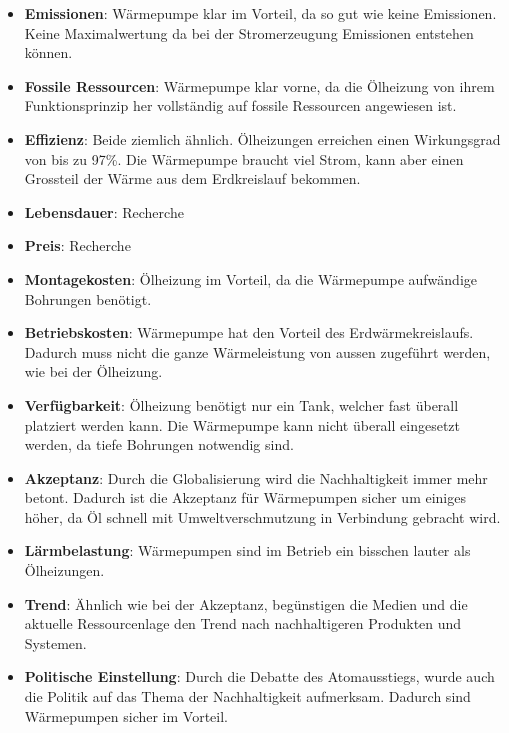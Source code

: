 \begin{itemize}

\item \textbf{Emissionen}: Wärmepumpe klar im Vorteil, da so gut wie keine Emissionen. Keine Maximalwertung da bei der Stromerzeugung Emissionen entstehen können.

\item \textbf{Fossile Ressourcen}: Wärmepumpe klar vorne, da die Ölheizung von ihrem Funktionsprinzip her vollständig auf fossile Ressourcen angewiesen ist.

\item \textbf{Effizienz}: Beide ziemlich ähnlich. Ölheizungen erreichen einen Wirkungsgrad von bis zu 97\%. Die Wärmepumpe braucht viel Strom, kann aber einen Grossteil der Wärme aus dem Erdkreislauf bekommen.

\item \textbf{Lebensdauer}: Recherche

\item \textbf{Preis}: Recherche

\item \textbf{Montagekosten}: Ölheizung im Vorteil, da die Wärmepumpe aufwändige Bohrungen benötigt.

\item \textbf{Betriebskosten}: Wärmepumpe hat den Vorteil des Erdwärmekreislaufs. Dadurch muss nicht die ganze Wärmeleistung von aussen zugeführt werden, wie bei der Ölheizung.

\item \textbf{Verfügbarkeit}: Ölheizung benötigt nur ein Tank, welcher fast überall platziert werden kann. Die Wärmepumpe kann nicht überall eingesetzt werden, da tiefe Bohrungen notwendig sind. 

\item \textbf{Akzeptanz}: Durch die Globalisierung wird die Nachhaltigkeit immer mehr betont. Dadurch ist die Akzeptanz für Wärmepumpen sicher um einiges höher, da Öl schnell mit Umweltverschmutzung in Verbindung gebracht wird.

\item \textbf{Lärmbelastung}: Wärmepumpen sind im Betrieb ein bisschen lauter als Ölheizungen.

\item \textbf{Trend}: Ähnlich wie bei der Akzeptanz, begünstigen die Medien und die aktuelle Ressourcenlage den Trend nach nachhaltigeren Produkten und Systemen.

\item \textbf{Politische Einstellung}: Durch die Debatte des Atomausstiegs, wurde auch die Politik auf das Thema der Nachhaltigkeit aufmerksam. Dadurch sind Wärmepumpen sicher im Vorteil.

\end{itemize}
